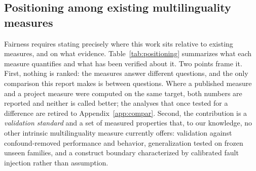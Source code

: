 \documentclass[11pt,a4paper]{article}
\begin{document}
\subsection{Positioning among existing multilinguality measures}
\label{sec:positioning}
Fairness requires stating precisely where this work sits relative to
existing measures, and on what evidence. Table~\ref{tab:positioning}
summarizes what each measure quantifies and what has been verified about it. Two points frame it. First, nothing is ranked: the measures answer different questions, and the only comparison this report makes is between questions. Where a published measure and a project measure were computed on the same target, both numbers are reported and neither is called better; the analyses that once tested for a difference are retired to Appendix~\ref{app:compar}. Second, the contribution is a \emph{validation standard} and a set of measured properties that, to our knowledge, no other intrinsic multilinguality measure currently offers: validation against
confound-removed performance and behavior, generalization tested on frozen
unseen families, and a construct boundary characterized by calibrated
fault injection rather than assumption.
\end{document}
